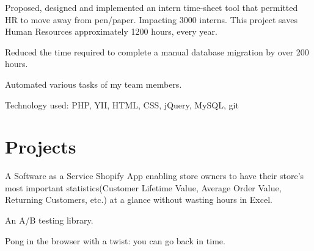 \documentclass[letterpaper]{deedy-resume} %
\begin{document}
\sectionspace %


\begin{tightitemize}
\item Proposed, designed and implemented an intern time-sheet tool that
  permitted HR to move away from pen/paper. Impacting 3000 interns.
  This project saves Human Resources approximately 1200 hours, every year.
\item Reduced the time required to complete a manual database
  migration by over 200 hours.
\item Automated various tasks of my team members.
\item Technology used: PHP, YII, HTML, CSS, jQuery, MySQL, git
\end{tightitemize}

\sectionspace %


\section{Projects}


A Software as a Service Shopify App enabling store owners to have
their store's most important statistics(Customer Lifetime Value,
Average Order Value, Returning Customers, etc.) at a glance without
wasting hours in Excel.
\sectionspace


An A/B testing library.
\sectionspace


Pong in the browser with a twist: you can go back in time.
\sectionspace
\end{document}
